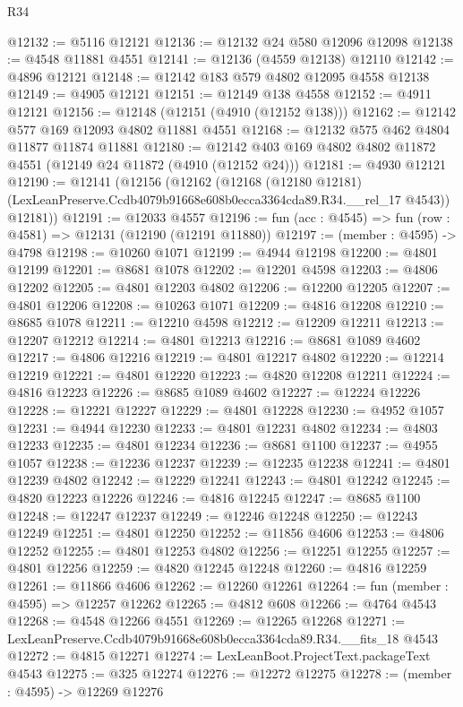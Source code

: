 \begin{lexlean}{R34}
\begin{coremodule}
@12132 := @5116 @12121
@12136 := @12132 @24 @580 @12096 @12098
@12138 := @4548 @11881 @4551
@12141 := @12136 (@4559 @12138) @12110
@12142 := @4896 @12121
@12148 := @12142 @183 @579 @4802 @12095 @4558 @12138
@12149 := @4905 @12121
@12151 := @12149 @138 @4558
@12152 := @4911 @12121
@12156 := @12148 (@12151 (@4910 (@12152 @138)))
@12162 := @12142 @577 @169 @12093 @4802 @11881 @4551
@12168 := @12132 @575 @462 @4804 @11877 @11874 @11881
@12180 := @12142 @403 @169 @4802 @4802 @11872 @4551 (@12149 @24 @11872 (@4910 (@12152 @24)))
@12181 := @4930 @12121
@12190 := @12141
    (@12156
      (@12162
        (@12168
          (@12180 @12181)
          (LexLeanPreserve.Ccdb4079b91668e608b0ecca3364cda89.R34.__rel_17 @4543))
        @12181))
@12191 := @12033 @4557
@12196 := fun (acc : @4545) => fun (row : @4581) => @12131 (@12190 (@12191 @11880))
@12197 := (member : @4595) -> @4798
@12198 := @10260 @1071
@12199 := @4944 @12198
@12200 := @4801 @12199
@12201 := @8681 @1078
@12202 := @12201 @4598
@12203 := @4806 @12202
@12205 := @4801 @12203 @4802
@12206 := @12200 @12205
@12207 := @4801 @12206
@12208 := @10263 @1071
@12209 := @4816 @12208
@12210 := @8685 @1078
@12211 := @12210 @4598
@12212 := @12209 @12211
@12213 := @12207 @12212
@12214 := @4801 @12213
@12216 := @8681 @1089 @4602
@12217 := @4806 @12216
@12219 := @4801 @12217 @4802
@12220 := @12214 @12219
@12221 := @4801 @12220
@12223 := @4820 @12208 @12211
@12224 := @4816 @12223
@12226 := @8685 @1089 @4602
@12227 := @12224 @12226
@12228 := @12221 @12227
@12229 := @4801 @12228
@12230 := @4952 @1057
@12231 := @4944 @12230
@12233 := @4801 @12231 @4802
@12234 := @4803 @12233
@12235 := @4801 @12234
@12236 := @8681 @1100
@12237 := @4955 @1057
@12238 := @12236 @12237
@12239 := @12235 @12238
@12241 := @4801 @12239 @4802
@12242 := @12229 @12241
@12243 := @4801 @12242
@12245 := @4820 @12223 @12226
@12246 := @4816 @12245
@12247 := @8685 @1100
@12248 := @12247 @12237
@12249 := @12246 @12248
@12250 := @12243 @12249
@12251 := @4801 @12250
@12252 := @11856 @4606
@12253 := @4806 @12252
@12255 := @4801 @12253 @4802
@12256 := @12251 @12255
@12257 := @4801 @12256
@12259 := @4820 @12245 @12248
@12260 := @4816 @12259
@12261 := @11866 @4606
@12262 := @12260 @12261
@12264 := fun (member : @4595) => @12257 @12262
@12265 := @4812 @608
@12266 := @4764 @4543
@12268 := @4548 @12266 @4551
@12269 := @12265 @12268
@12271 := LexLeanPreserve.Ccdb4079b91668e608b0ecca3364cda89.R34.__fits_18 @4543
@12272 := @4815 @12271
@12274 := LexLeanBoot.ProjectText.packageText @4543
@12275 := @325 @12274
@12276 := @12272 @12275
@12278 := (member : @4595) -> @12269 @12276

\end{coremodule}
\end{lexlean}
